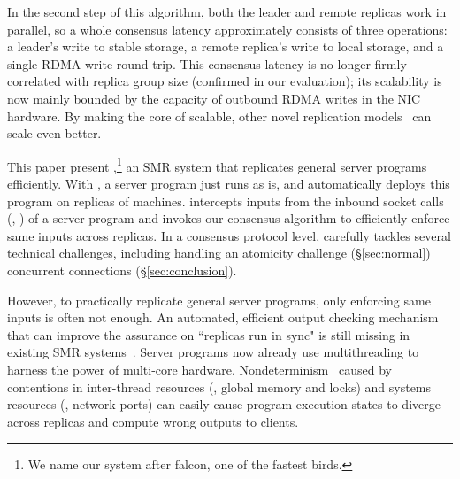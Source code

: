 In the second step of this algorithm, both the leader and remote replicas work 
in parallel, so a whole consensus latency approximately consists of 
three operations: a leader's write to stable storage, a remote replica's write 
to local storage, and a single RDMA write round-trip. This consensus latency is 
no longer firmly correlated with replica group size (confirmed in our 
evaluation); its scalability is now mainly bounded by the capacity of 
outbound RDMA writes in the NIC hardware. By making the core of \paxos 
scalable, other novel replication 
models~\cite{epaxos:sosp13,mencius:osdi08,scatter:sosp11,manos:hotdep10} can 
scale even better.

This paper present \xxx,\footnote{We name our system after falcon, one of the 
fastest birds.} an SMR system that replicates general server programs 
efficiently. With \xxx, a server program just runs as is, and \xxx 
automatically deploys this program on replicas of machines. \xxx intercepts 
inputs from the inbound socket calls (\eg, \recv) of a server program and 
invokes our \paxos consensus algorithm to efficiently enforce same inputs 
across replicas. In a consensus protocol level, \xxx carefully tackles several 
technical challenges, including handling an atomicity challenge 
(\S\ref{sec:normal}) concurrent connections (\S\ref{sec:conclusion}).


However, to practically replicate general server programs, only enforcing same 
inputs is often not enough. An automated, efficient output checking mechanism 
that can improve the assurance on ``replicas run in sync" is still missing in 
existing SMR 
systems~\cite{calvin:sigmod12,rex:eurosys14,crane:sosp15,dare:hpdc15}. Server 
programs now already use multithreading to harness the power of multi-core 
hardware. Nondeterminism~\cite{racepro:sosp11,dmp:asplos09,coredet:asplos10,
cui:tern:osdi10, kendo:asplos09,
dthreads:sosp11,peregrine:sosp11,parrot:sosp13,determinator:osdi10} caused by 
contentions in inter-thread resources (\eg, global memory and locks) and systems 
resources (\eg, network ports) can easily cause program execution states to 
diverge across replicas and compute wrong outputs to clients.

